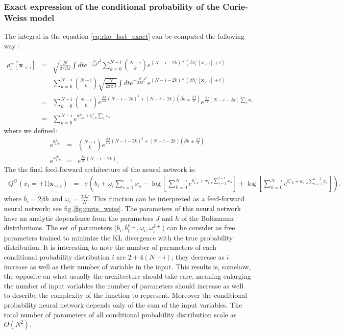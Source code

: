 \documentclass{article}
\begin{document}
 \subsubsection{Exact expression of the conditional probability of the Curie-Weiss model}
 The integral in the equation \ref{eq:rho_last_exact} can be computed the following way :

 \begin{eqnarray*}
 \rho_i^{\pm}[\mathbf{x}_{<i}] &=& \sqrt{\frac{N}{2\pi \beta J}}\int dt e^{-\frac{N}{2J \beta}t^{2}} 
 \sum_{k=0}^{N-i} \binom{N-i}{k} e^{(N-i-2k)*(\beta h_i^{\pm}[\mathbf{x}_{<i}] + t)}\\
 &=& \sum_{k=0}^{N-i} \binom{N-i}{k} \sqrt{\frac{N}{2\pi \beta J}}\int dt e^{-\frac{N}{2J \beta}t^{2}} 
  e^{(N-i-2k)*(\beta h_i^{\pm}[\mathbf{x}_{<i}] + t)}\\
&=& \sum_{k=0}^{N-i} \binom{N-i}{k}e^{\frac{\beta J}{2N}\left(N-i-2k\right)^{2}+\left(N-i-2k\right)\left(\beta h \pm \frac{\beta J}{N}\right)} e^{\frac{\beta J}{N}\left(N-i-2k\right) \sum_s x_s} \\
&=& \sum_{k=0}^{N-i} e^{a_{i,k}^{\pm} + b_{i,k}^{\pm} \sum_s x_s} 
\end{eqnarray*}
where we defined:
\begin{eqnarray}
\label{eq:params}
e^{b_{i,k}^{\pm}} & = & \binom{N-i}{k}e^{\frac{\beta J}{2N}\left(N-i-2k\right)^{2}+\left(N-i-2k\right)\left(\beta h \pm \frac{\beta J}{N}\right)}\\
e^{\omega_{i,k}^{\pm}} & = & e^{\frac{\beta J}{N}\left(N-i-2k\right)}.
\end{eqnarray}
The the final feed-forward architecture of the neural network is:
\begin{eqnarray}\
\label{eq:curie_weiss_cond}
Q^{\Theta}\left(x_{i}=+1|\mathbf{x}_{<i}\right) & = &  \sigma \left(b_{i}+\omega_{i}\sum_{s=1}^{i-1}x_{s}-\log\left[\sum_{k=0}^{N-i}e^{b_{i,k}^{+}+w_{i,k}^{+}\sum_{s=1}^{i-1}x_{s}}\right]+\log\left[\sum_{k=0}^{N-i}e^{b_{i,k}^{-} + w_{i,k}^{-}\sum_{s=1}^{i-1}x_{s}}\right]\right).
\end{eqnarray}
where $b_i=2\beta h$ and $\omega_i=\frac{2\beta J}{N}$. 
\newline
This function can be interpreted as a feed-forward neural network; see fig.\ref{fig:curie_weiss}. 
The parameters of this neural network have an analytic dependence from the parameters $J$ and $h$ of the Boltzmann distributions. 
The set of parameters ($b_i, b_i^{k\pm}, \omega_i, \omega_i^{k\pm}$) can be consider as free parameters trained to minimize the KL divergence with the true probability distribution. 
It is interesting to note the number of parameters of each conditional probability distribution $i$ are $2+4(N-i)$; they decrease as $i$ increase as well as their number of variable in the input. This results is, somehow, the opposite on what usually the architecture should take care, meaning enlarging the number of input variables the number of parameters should increase as well to describe the complexity of the function to represent. Moreover the conditional probability neural network depends only of the sum of the input variables.
The total number of parameters of all conditional probability distribution scale as $O(N^2)$. 
\end{document}
